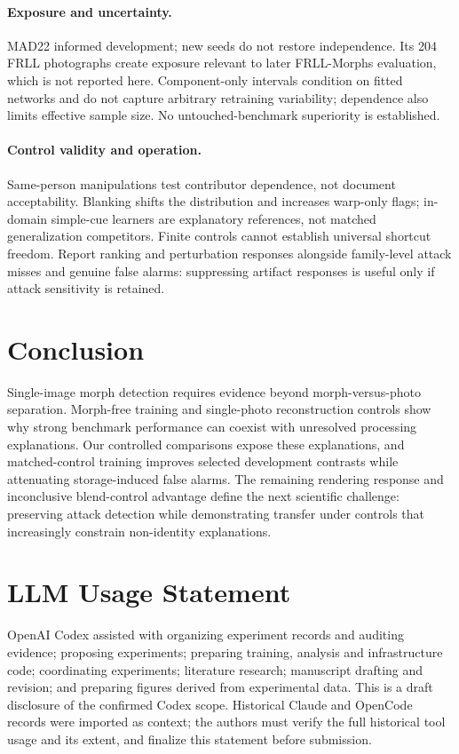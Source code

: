 \documentclass[10pt,twocolumn,letterpaper]{article}
\begin{document}
\paragraph{Exposure and uncertainty.}
MAD22 informed development; new seeds do not restore independence. Its 204 FRLL photographs create exposure relevant to later FRLL-Morphs evaluation, which is not reported here. Component-only intervals condition on fitted networks and do not capture arbitrary retraining variability; dependence also limits effective sample size. No untouched-benchmark superiority is established.

\paragraph{Control validity and operation.}
Same-person manipulations test contributor dependence, not document acceptability. Blanking shifts the distribution and increases warp-only flags; in-domain simple-cue learners are explanatory references, not matched generalization competitors. Finite controls cannot establish universal shortcut freedom. Report ranking and perturbation responses alongside family-level attack misses and genuine false alarms: suppressing artifact responses is useful only if attack sensitivity is retained.

\section{Conclusion}
Single-image morph detection requires evidence beyond morph-versus-photo separation. Morph-free training and single-photo reconstruction controls show why strong benchmark performance can coexist with unresolved processing explanations. Our controlled comparisons expose these explanations, and matched-control training improves selected development contrasts while attenuating storage-induced false alarms. The remaining rendering response and inconclusive blend-control advantage define the next scientific challenge: preserving attack detection while demonstrating transfer under controls that increasingly constrain non-identity explanations.

\section*{LLM Usage Statement}
OpenAI Codex assisted with organizing experiment records and auditing evidence; proposing experiments; preparing training, analysis and infrastructure code; coordinating experiments; literature research; manuscript drafting and revision; and preparing figures derived from experimental data. This is a draft disclosure of the confirmed Codex scope. Historical Claude and OpenCode records were imported as context; the authors must verify the full historical tool usage and its extent, and finalize this statement before submission.

{\small}
\end{document}
